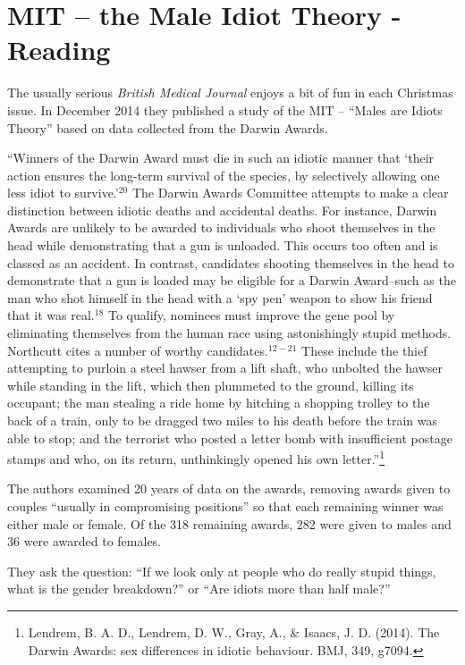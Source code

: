 \def\theTopic{Reading 8}

\section{ MIT -- the Male Idiot Theory - Reading}


The usually  serious {\em British Medical Journal} enjoys a bit
of fun in each Christmas issue.  In December 2014 they
published a study of the MIT -- ``Males are Idiots Theory'' based on
data collected from the Darwin Awards.

``Winners of the Darwin Award must die in such an idiotic
manner that `their action ensures the long-term survival of the
species, by selectively allowing one less idiot to survive.'$^{20}$ The
Darwin Awards Committee attempts to make a clear distinction
between idiotic deaths and accidental deaths. For instance,
Darwin Awards are unlikely to be awarded to individuals who
shoot themselves in the head while demonstrating that a gun is
unloaded. This occurs too often and is classed as an accident.
In contrast, candidates shooting themselves in the head to
demonstrate that a gun is loaded may be eligible for a Darwin
Award--such as the man who shot himself in the head with a
`spy pen' weapon to show his friend that it was real.$^{18}$
To qualify, nominees must improve the gene pool by eliminating
themselves from the human race using astonishingly stupid
methods. Northcutt cites a number of worthy candidates.$^{12-21}$
These include the thief attempting to purloin a steel hawser from
a lift shaft, who unbolted the hawser while standing in the lift,
which then plummeted to the ground, killing its occupant; the
man stealing a ride home by hitching a shopping trolley to the
back of a train, only to be dragged two miles to his death before
the train was able to stop; and the terrorist who posted a letter
bomb with insufficient postage stamps and who, on its return,
unthinkingly opened his own letter.''\footnote{Lendrem, B. A. D.,
  Lendrem, D. W., Gray, A., \& Isaacs, J. D. (2014). The Darwin
  Awards: sex differences in idiotic behaviour. BMJ, 349, g7094.} 

The authors examined 20 years of data on the awards, removing awards
given to couples ``usually in compromising positions'' so that each
remaining winner was either male or female. Of the 318 remaining
awards, 282 were given to males and 36 were awarded to females.

They ask the question: ``If we look only at  people who do really
stupid things, what is the gender breakdown?''  or ``Are idiots more
than half male?''

